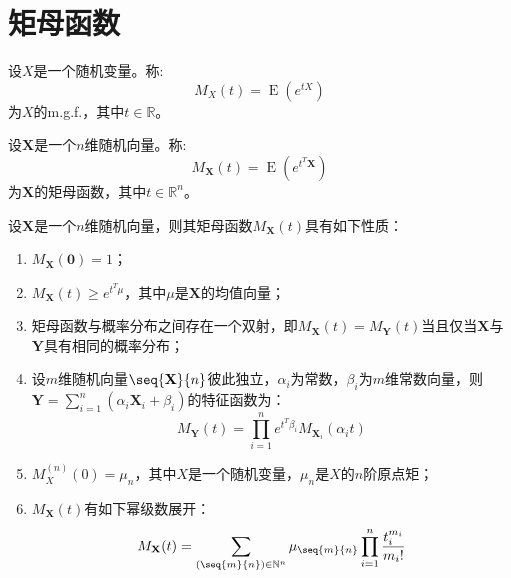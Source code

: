 \section{矩母函数}

\begin{definition}
	设$X$是一个随机变量。称:
	\begin{equation*}
		M_X(t)=\operatorname{E}(e^{tX})
	\end{equation*}
	为$X$的\gls{m.g.f.}，其中$t\in\mathbb{R}$。
\end{definition}
\begin{definition}
	设$\mathbf{X}$是一个$n$维随机向量。称:
	\begin{equation*}
		M_\mathbf{X}(t)=\operatorname{E}(e^{t^T\mathbf{X}})
	\end{equation*}
	为$\mathbf{X}$的矩母函数，其中$t\in\mathbb{R}^{n}$。
\end{definition}
\begin{property}\label{prop:m.g.f.}
	设$\mathbf{X}$是一个$n$维随机向量，则其矩母函数$M_\mathbf{X}(t)$具有如下性质：
	\begin{enumerate}
		\item $M_\mathbf{X}(\mathbf{0})=1$；
		\item $M_\mathbf{X}(t)\geqslant e^{t^T\mu}$，其中$\mu$是$\mathbf{X}$的均值向量；
		\item 矩母函数与概率分布之间存在一个双射，即$M_\mathbf{X}(t)=M_\mathbf{Y}(t)$当且仅当$\mathbf{X}$与$\mathbf{Y}$具有相同的概率分布；
		\item 设$m$维随机向量$\seq{\mathbf{X}}{n}$彼此独立，$\alpha_i$为常数，$\beta_i$为$m$维常数向量，则$\mathbf{Y}=\sum\limits_{i=1}^{n}(\alpha_i\mathbf{X}_i+\beta_i)$的特征函数为：
		\begin{equation*}
			M_\mathbf{Y}(t)=\prod_{i=1}^ne^{t^T\beta_i}M_{\mathbf{X}_i}(\alpha_it)
		\end{equation*}
		\item $M_X^{(n)}(0)=\mu_n$，其中$X$是一个随机变量，$\mu_n$是$X$的$n$阶原点矩；
		\item $M_\mathbf{X}(t)$有如下幂级数展开：
		\begin{equation*}
			M_\mathbf{X}(t)=\sum_{(\seq{m}{n})\in\mathbb{N}^n}\mu_{\seq{m}{n}}\prod_{i=1}^{n}\frac{t_i^{m_i}}{m_i!}
		\end{equation*}
	\end{enumerate}
\end{property}
